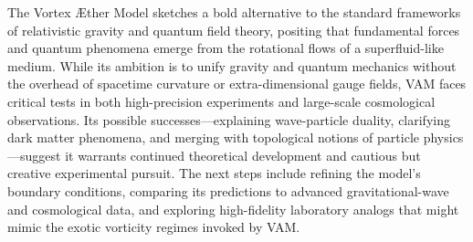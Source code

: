 The Vortex Æther Model sketches a bold alternative to the standard frameworks of relativistic gravity and quantum field theory, positing that fundamental forces and quantum phenomena emerge from the rotational flows of a superfluid-like medium. While its ambition is to unify gravity and quantum mechanics without the overhead of spacetime curvature or extra-dimensional gauge fields, VAM faces critical tests in both high-precision experiments and large-scale cosmological observations. Its possible successes—explaining wave-particle duality, clarifying dark matter phenomena, and merging with topological notions of particle physics—suggest it warrants continued theoretical development and cautious but creative experimental pursuit. The next steps include refining the model’s boundary conditions, comparing its predictions to advanced gravitational-wave and cosmological data, and exploring high-fidelity laboratory analogs that might mimic the exotic vorticity regimes invoked by VAM.
